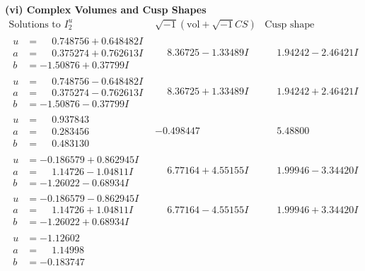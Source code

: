 \documentclass[1p]{elsarticle_modified}
\theoremstyle{definition}
\newcommand{\I}{\sqrt{-1}}
\begin{document}
\newpage\flushleft \textbf{(vi) Complex Volumes and Cusp Shapes}
$$\begin{array}{c|c|c}  
\text{Solutions to }I^u_{2}& \I (\text{vol} + \sqrt{-1}CS) & \text{Cusp shape}\\
 \hline 
\begin{aligned}
u &= \phantom{-}0.748756 + 0.648482 I \\
a &= \phantom{-}0.375274 + 0.762613 I \\
b &= -1.50876 + 0.37799 I\end{aligned}
 & \phantom{-}8.36725 - 1.33489 I & \phantom{-}1.94242 - 2.46421 I \\ \hline\begin{aligned}
u &= \phantom{-}0.748756 - 0.648482 I \\
a &= \phantom{-}0.375274 - 0.762613 I \\
b &= -1.50876 - 0.37799 I\end{aligned}
 & \phantom{-}8.36725 + 1.33489 I & \phantom{-}1.94242 + 2.46421 I \\ \hline\begin{aligned}
u &= \phantom{-}0.937843\phantom{ +0.000000I} \\
a &= \phantom{-}0.283456\phantom{ +0.000000I} \\
b &= \phantom{-}0.483130\phantom{ +0.000000I}\end{aligned}
 & -0.498447\phantom{ +0.000000I} & \phantom{-}5.48800\phantom{ +0.000000I} \\ \hline\begin{aligned}
u &= -0.186579 + 0.862945 I \\
a &= \phantom{-}1.14726 - 1.04811 I \\
b &= -1.26022 - 0.68934 I\end{aligned}
 & \phantom{-}6.77164 + 4.55155 I & \phantom{-}1.99946 - 3.34420 I \\ \hline\begin{aligned}
u &= -0.186579 - 0.862945 I \\
a &= \phantom{-}1.14726 + 1.04811 I \\
b &= -1.26022 + 0.68934 I\end{aligned}
 & \phantom{-}6.77164 - 4.55155 I & \phantom{-}1.99946 + 3.34420 I \\ \hline\begin{aligned}
u &= -1.12602\phantom{ +0.000000I} \\
a &= \phantom{-}1.14998\phantom{ +0.000000I} \\
b &= -0.183747\phantom{ +0.000000I}\end{aligned}

\end{array}$$
\end{document}
